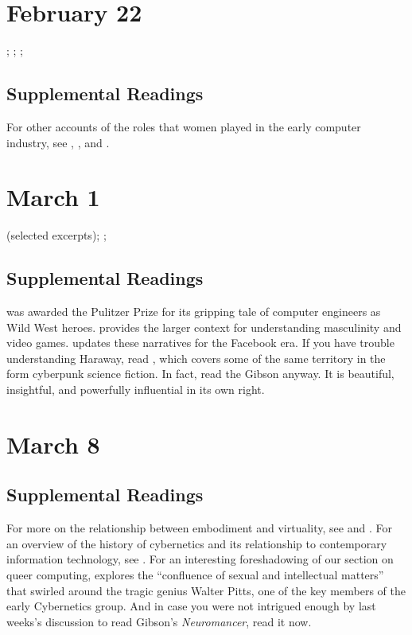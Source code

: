 \documentclass[11pt]{article}
\begin{document}
\section{February 22}

; ; ;

\subsection{Supplemental Readings}

For other accounts of the roles that women played in the early computer industry, see \cite{Shetterly2016}, \cite{Grier2005}, and \cite{Gurer2002}.

\section{March 1}

 (selected excerpts); 
; 

\subsection{Supplemental Readings}

\cite{Kidder1981} was awarded the Pulitzer Prize for its gripping
tale of computer engineers as Wild West heroes. \cite{Kocurek2015}
provides the larger context for understanding masculinity and video
games. \cite{Losse2012} updates these narratives for the Facebook
era. If you have trouble understanding Haraway, read
\cite{Gibson1995}, which covers some of the same territory in the
form cyberpunk science fiction. In fact, read the Gibson anyway. It is
beautiful, insightful, and powerfully influential in its own right.

\section{March 8}


\subsection{Supplemental Readings}

For more on the relationship between embodiment and virtuality, see \cite{Stone1996} and \cite{Balsamo1996}.  For an overview of the history of cybernetics and its relationship to contemporary information technology, see \cite{Kline2015}.  For an interesting foreshadowing of our section on queer computing, \cite{Wilson2009} explores the ``confluence of sexual and intellectual matters'' that swirled around the tragic genius Walter Pitts, one of the key members of the early Cybernetics group. And in case you were not intrigued enough by last weeks's discussion to read Gibson's \emph{Neuromancer}, read it now.
\end{document}
